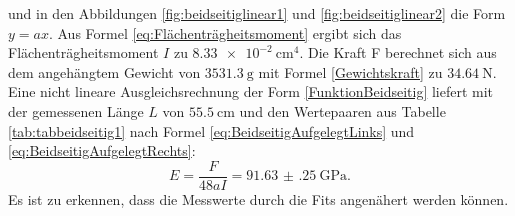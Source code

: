 und in den Abbildungen \ref{fig:beidseitiglinear1} und \ref{fig:beidseitiglinear2} die Form $y=a x$. Aus Formel \eqref{eq:Flächenträgheitsmoment} ergibt sich das Flächenträgheitsmoment $I$ zu $\SI{8.33e-2}{\centi\meter\tothe{4}}$.  Die Kraft F berechnet sich aus dem angehängtem Gewicht von $\SI{3531.3}{\gram}$ mit Formel \eqref{Gewichtskraft} zu $\SI{34.64}{\newton}$. Eine nicht lineare Ausgleichsrechnung der Form \eqref{FunktionBeidseitig} liefert mit der gemessenen Länge $L$ von $\SI{55.5}{\centi\meter}$ und den Wertepaaren aus Tabelle \ref{tab:tabbeidseitig1} nach Formel \eqref{eq:BeidseitigAufgelegtLinks} und \eqref{eq:BeidseitigAufgelegtRechts}:
\begin{displaymath}
E = \frac{F}{48 a I}= \SI{91.63(25)}{\giga\pascal}\text{.}
\end{displaymath}
Es ist zu erkennen, dass die Messwerte durch die Fits angenähert werden können.
